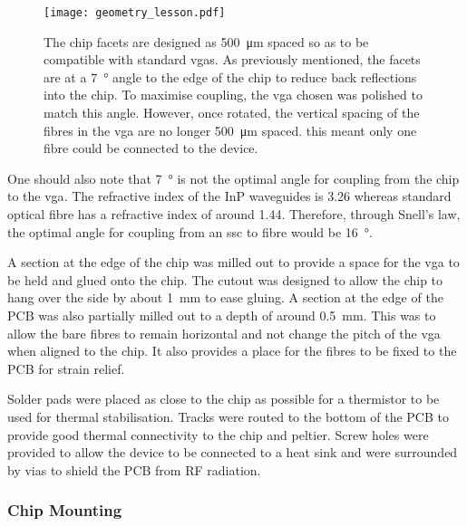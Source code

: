 
\begin{figure}[t]
	\centering
	\texttt{[image: geometry\_lesson.pdf]}
	\caption[A quick lesson in geometry for edge coupling]{The chip facets are designed as \SI{500}{\um} spaced so as to be compatible with standard \acp{vga}. As previously mentioned, the facets are at a \SI{7}{\degree} angle to the edge of the chip to reduce back reflections into the chip. To maximise coupling, the \ac{vga} chosen was polished to match this angle. However, once rotated, the vertical spacing of the fibres in the \ac{vga} are no longer \SI{500}{\um} spaced. this meant only one fibre could be connected to the device.}
	\label{fig:geometry_lesson}
\end{figure}

One should also note that \SI{7}{\degree} is not the optimal angle for coupling from the chip to the \ac{vga}. The refractive index of the \ac{InP} waveguides is 3.26 whereas standard optical fibre has a refractive index of around 1.44. Therefore, through Snell's law, the optimal angle for coupling from an \ac{ssc} to fibre would be \SI{16}{\degree}. 

A section at the edge of the chip was milled out to provide a space for the \ac{vga} to be held and glued onto the chip. The cutout was designed to allow the chip to hang over the side by about \SI{1}{\mm} to ease gluing. A section at the edge of the PCB was also partially milled out to a depth of around \SI{0.5}{\mm}. This was to allow the bare fibres to remain horizontal and not change the pitch of the \ac{vga} when aligned to the chip. It also provides a place for the fibres to be fixed to the PCB for strain relief.

Solder pads were placed as close to the chip as possible for a thermistor to be used for thermal stabilisation. Tracks were routed to the bottom of the PCB to provide good thermal connectivity to the chip and peltier. Screw holes were provided to allow the device to be connected to a heat sink and were surrounded by vias to shield the PCB from RF radiation.

\subsubsection*{Chip Mounting}

